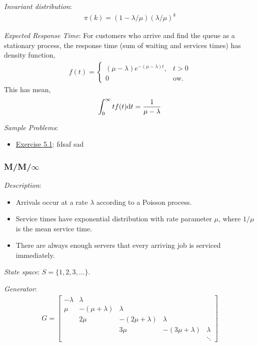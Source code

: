 \documentclass[12pt]{article}
\begin{document}
\textit{Invariant distribution}:
\begin{align*}
    \pi(k) = (1-\lambda/\mu)(\lambda/\mu)^k
\end{align*}

\textit{Expected Response Time}:
For customers who arrive and find the queue as a stationary process, the response time (sum of waiting and services times) has density function,
\begin{align*}
    f(t) = \begin{cases}
        (\mu-\lambda)e^{-(\mu-\lambda)t}, & t > 0 \\ 0 & \text{ow.}
    \end{cases} 
\end{align*}
This has mean,
\begin{align*}
    \int_0^\infty tf(t)\mathrm{d} t = \frac{1}{\mu - \lambda}
\end{align*}


\textit{Sample Problems}: 
\begin{itemize}[nolistsep]
    \item \hyperref[Exercise 5.1]{Exercise 5.1}: fdsaf sad
\end{itemize}


\subsubsection{M/M/\(\infty\)}
\textit{Description}:
\begin{itemize}[nolistsep]
\item Arrivals occur at a rate \( \lambda \) according to a Poisson process. 
\item Service times have exponential distribution with rate parameter \( \mu \), where \( 1/\mu \) is the mean service time.
\item There are always enough servers that every arriving job is serviced immediately.
\end{itemize}


\textit{State space}: \( S = \{1,2,3,\ldots\} \).

\textit{Generator}:
\begin{align*}
    G = \left[\begin{array}{cccccc}
        -\lambda & \lambda \\
        \mu & -(\mu+\lambda) & \lambda \\
        & 2\mu & -(2\mu+\lambda) & \lambda \\
        & & 3\mu & -(3\mu+\lambda) & \lambda \\
        && & & \ddots 
    \end{array}\right]
\end{align*}
\end{document}
